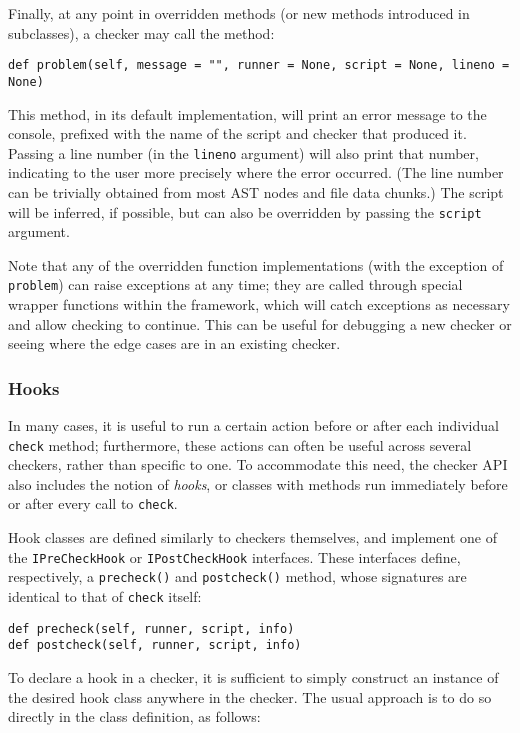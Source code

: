 \documentclass{article}
\begin{document}
Finally, at any point in overridden methods (or new methods introduced in subclasses), a checker may call the method:

\begin{verbatim}
def problem(self, message = "", runner = None, script = None, lineno = None)
\end{verbatim}

This method, in its default implementation, will print an error message to the console, prefixed with the name of the script and checker that produced it. Passing a line number (in the \verb!lineno! argument) will also print that number, indicating to the user more precisely where the error occurred. (The line number can be trivially obtained from most AST nodes and file data chunks.) The script will be inferred, if possible, but can also be overridden by passing the \verb!script! argument.

Note that any of the overridden function implementations (with the exception of \verb!problem!) can raise exceptions at any time; they are called through special wrapper functions within the framework, which will catch exceptions as necessary and allow checking to continue. This can be useful for debugging a new checker or seeing where the edge cases are in an existing checker.

\subsubsection*{Hooks}

In many cases, it is useful to run a certain action before or after each individual \verb!check! method; furthermore, these actions can often be useful across several checkers, rather than specific to one. To accommodate this need, the checker API also includes the notion of \textit{hooks}, or classes with methods run immediately before or after every call to \verb!check!.

Hook classes are defined similarly to checkers themselves, and implement one of the \verb!IPreCheckHook! or \verb!IPostCheckHook! interfaces. These interfaces define, respectively, a \verb!precheck()! and \verb!postcheck()! method, whose signatures are identical to that of \verb!check! itself:

\begin{verbatim}
def precheck(self, runner, script, info)
def postcheck(self, runner, script, info)
\end{verbatim}

To declare a hook in a checker, it is sufficient to simply construct an instance of the desired hook class anywhere in the checker. The usual approach is to do so directly in the class definition, as follows:
\end{document}
